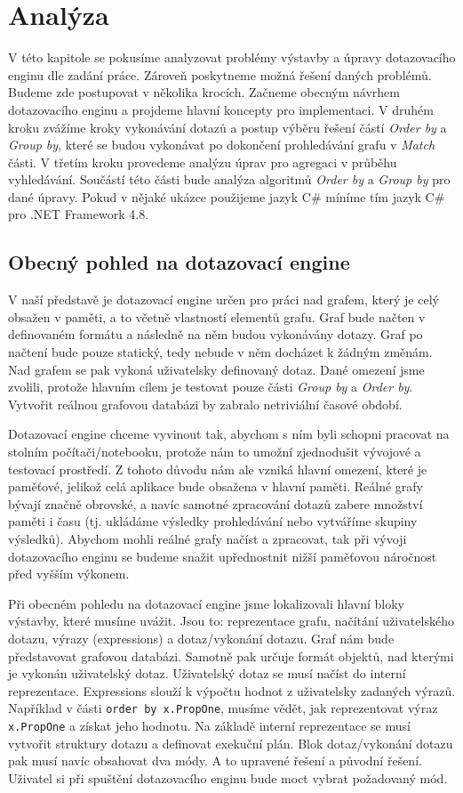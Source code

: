 \chapter{Analýza}

V této kapitole se pokusíme analyzovat problémy výstavby a úpravy dotazovacího enginu dle zadání práce.
Zároveň poskytneme možná řešení daných problémů.
Budeme zde postupovat v několika krocích. 
Začneme obecným návrhem dotazovacího enginu a projdeme hlavní koncepty pro implementaci.
V druhém kroku zvážíme kroky vykonávání dotazů a postup výběru řešení částí \textit{Order by} a \textit{Group by}, které se budou vykonávat po dokončení prohledávání grafu v \textit{Match} části.
V třetím kroku provedeme analýzu úprav pro agregaci v průběhu vyhledávání. 
Součástí této části bude analýza algoritmů \textit{Order by} a \textit{Group by} pro dané úpravy. 
Pokud v nějaké ukázce použijeme jazyk C\# míníme tím jazyk C\# pro .NET Framework 4.8.

\section{Obecný pohled na dotazovací engine}

V naší představě je dotazovací engine určen pro práci nad grafem, který je celý obsažen v paměti, a to včetně vlastností elementů grafu.
Graf bude načten v definovaném formátu a následně na něm budou vykonávány dotazy.
Graf po načtení bude pouze statický, tedy nebude v něm docházet k žádným změnám.
Nad grafem se pak vykoná uživatelsky definovaný dotaz.
Dané omezení jsme zvolili, protože hlavním cílem je testovat pouze části \textit{Group by} a \textit{Order by}.
Vytvořit reálnou grafovou databázi by zabralo netriviální časové období.

Dotazovací engine chceme vyvinout tak, abychom s ním byli schopni pracovat na stolním počítači/notebooku, protože nám to umožní zjednodušit vývojové a testovací prostředí.
Z tohoto důvodu nám ale vzniká hlavní omezení, které je paměťové, jelikož celá aplikace bude obsažena v hlavní paměti.
Reálné grafy bývají značně obrovské, a navíc samotné zpracování dotazů zabere množství paměti i času (tj. ukládáme výsledky prohledávání nebo vytváříme skupiny výsledků).
Abychom mohli reálné grafy načíst a zpracovat, tak při vývoji dotazovacího enginu se budeme snažit upřednostnit nižší paměťovou náročnost před vyšším výkonem.

Při obecném pohledu na dotazovací engine jsme lokalizovali hlavní bloky výstavby, které musíme uvážit.
Jsou to: reprezentace grafu, načítání uživatelského dotazu, výrazy (expressions) a dotaz/vykonání dotazu.
Graf nám bude představovat grafovou databázi. 
Samotně pak určuje formát objektů, nad kterými je vykonán uživatelský dotaz.
Uživatelský dotaz se musí načíst do interní reprezentace.
Expressions slouží k výpočtu hodnot z uživatelsky zadaných výrazů.
Například v části \texttt{order by x.PropOne}, musíme vědět, jak reprezentovat výraz \texttt{x.PropOne} a získat jeho hodnotu. 
Na základě interní reprezentace se musí vytvořit struktury dotazu a definovat exekuční plán. 
Blok dotaz/vykonání dotazu pak musí navíc obsahovat dva módy.
A to upravené řešení a původní řešení.
Uživatel si při spuštění dotazovacího enginu bude moct vybrat požadovaný mód.

